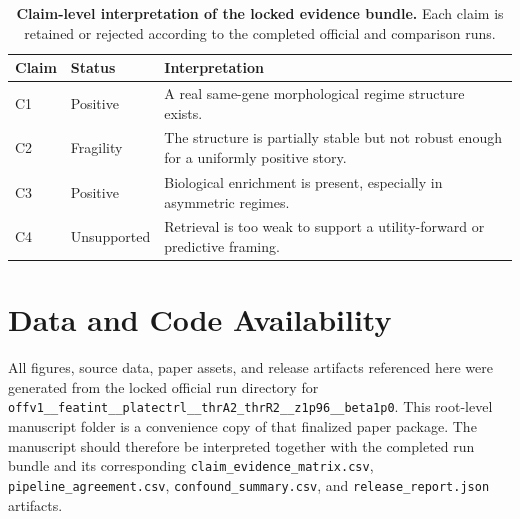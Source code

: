 \documentclass[11pt]{article}
\begin{document}
\begin{table}[H]
\centering
\caption{\textbf{Claim-level interpretation of the locked evidence bundle.} Each claim is retained or rejected according to the completed official and comparison runs.}
\begin{tabularx}{\textwidth}{>{\raggedright\arraybackslash}p{} >{\raggedright\arraybackslash}p{} >{\raggedright\arraybackslash}X}
\toprule
Claim & Status & Interpretation \\
\midrule
C1 & Positive & A real same-gene morphological regime structure exists. \\
C2 & Fragility & The structure is partially stable but not robust enough for a uniformly positive story. \\
C3 & Positive & Biological enrichment is present, especially in asymmetric regimes. \\
C4 & Unsupported & Retrieval is too weak to support a utility-forward or predictive framing. \\
\bottomrule
\end{tabularx}
\end{table}

\section*{Data and Code Availability}
All figures, source data, paper assets, and release artifacts referenced here were generated from the locked official run directory for \texttt{offv1\_\_featint\_\_platectrl\_\_thrA2\_thrR2\_\_z1p96\_\_beta1p0}. This root-level manuscript folder is a convenience copy of that finalized paper package. The manuscript should therefore be interpreted together with the completed run bundle and its corresponding \texttt{claim\_evidence\_matrix.csv}, \texttt{pipeline\_agreement.csv}, \texttt{confound\_summary.csv}, and \texttt{release\_report.json} artifacts.
\end{document}
